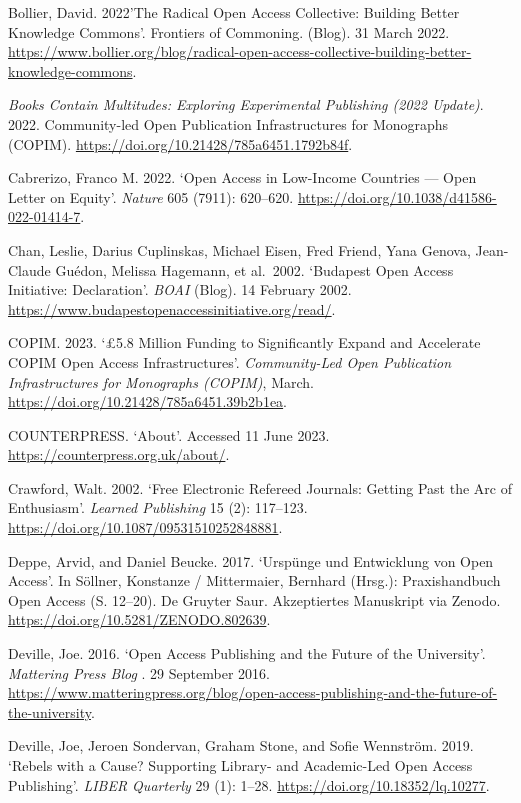\documentclass[a4paper,
fontsize=11pt,
oneside,
numbers=noperiodatend,
parskip=half-,
bibliography=totoc,
final
]{scrartcl}
\begin{document}
Bollier, David. 2022'The Radical Open Access Collective: Building Better
Knowledge Commons'. Frontiers of Commoning. (Blog). 31 March 2022.
\url{https://www.bollier.org/blog/radical-open-access-collective-building-better-knowledge-commons}.

\emph{Books Contain Multitudes: Exploring Experimental Publishing (2022
Update)}. 2022. Community-led Open Publication Infrastructures for
Monographs (COPIM). \url{https://doi.org/10.21428/785a6451.1792b84f}.

Cabrerizo, Franco M. 2022. \enquote*{Open Access in Low-Income Countries
--- Open Letter on Equity}. \emph{Nature} 605 (7911): 620--620.
\url{https://doi.org/10.1038/d41586-022-01414-7}.

Chan, Leslie, Darius Cuplinskas, Michael Eisen, Fred Friend, Yana
Genova, Jean-Claude Guédon, Melissa Hagemann, et al.~2002.
\enquote*{Budapest Open Access Initiative: Declaration}. \emph{BOAI}
(Blog). 14 February 2002.
\url{https://www.budapestopenaccessinitiative.org/read/}.

COPIM. 2023. \enquote*{£5.8 Million Funding to Significantly Expand and
Accelerate COPIM Open Access Infrastructures}. \emph{Community-Led Open
Publication Infrastructures for Monographs (COPIM)}, March.
\url{https://doi.org/10.21428/785a6451.39b2b1ea}.

COUNTERPRESS. \enquote*{About}. Accessed 11 June 2023.
\url{https://counterpress.org.uk/about/}.

Crawford, Walt. 2002. \enquote*{Free Electronic Refereed Journals:
Getting Past the Arc of Enthusiasm}. \emph{Learned Publishing} 15 (2):
117--123. \url{https://doi.org/10.1087/09531510252848881}.

Deppe, Arvid, and Daniel Beucke. 2017. \enquote*{Urspünge und
Entwicklung von Open Access}. In Söllner, Konstanze / Mittermaier,
Bernhard (Hrsg.): Praxishandbuch Open Access (S. 12--20). De Gruyter
Saur. Akzeptiertes Manuskript via Zenodo.
\url{https://doi.org/10.5281/ZENODO.802639}.

Deville, Joe. 2016. \enquote*{Open Access Publishing and the Future of the University}. \emph{Mattering Press Blog} . 29 September 2016. \url{https://www.matteringpress.org/blog/open-access-publishing-and-the-future-of-the-university}.

Deville, Joe, Jeroen Sondervan, Graham Stone, and Sofie Wennström. 2019.
\enquote*{Rebels with a Cause? Supporting Library- and Academic-Led Open
Access Publishing}. \emph{LIBER Quarterly} 29 (1): 1--28.
\url{https://doi.org/10.18352/lq.10277}.
\end{document}
